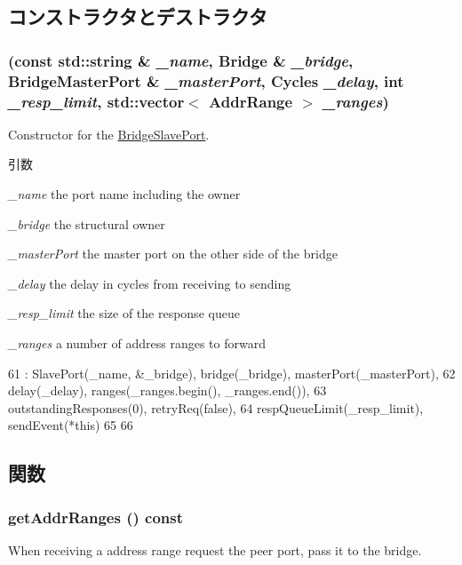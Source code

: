 \subsection{コンストラクタとデストラクタ}
\hypertarget{classBridge_1_1BridgeSlavePort_a2b4ad4cec25b318ebfcf261db753a8fb}{
\subsubsection[{BridgeSlavePort}]{ (const std::string \& {\em \_\-name}, \/  {\bf Bridge} \& {\em \_\-bridge}, \/  {\bf BridgeMasterPort} \& {\em \_\-masterPort}, \/  {\bf Cycles} {\em \_\-delay}, \/  int {\em \_\-resp\_\-limit}, \/  {\bf std::vector}$<$ {\bf AddrRange} $>$ {\em \_\-ranges})}}
\label{classBridge_1_1BridgeSlavePort_a2b4ad4cec25b318ebfcf261db753a8fb}
Constructor for the \hyperlink{classBridge_1_1BridgeSlavePort}{BridgeSlavePort}.


\begin{DoxyParams}{引数}
\item[{\em \_\-name}]the port name including the owner \item[{\em \_\-bridge}]the structural owner \item[{\em \_\-masterPort}]the master port on the other side of the bridge \item[{\em \_\-delay}]the delay in cycles from receiving to sending \item[{\em \_\-resp\_\-limit}]the size of the response queue \item[{\em \_\-ranges}]a number of address ranges to forward \end{DoxyParams}



\begin{DoxyCode}
61     : SlavePort(_name, &_bridge), bridge(_bridge), masterPort(_masterPort),
62       delay(_delay), ranges(_ranges.begin(), _ranges.end()),
63       outstandingResponses(0), retryReq(false),
64       respQueueLimit(_resp_limit), sendEvent(*this)
65 {
66 }
\end{DoxyCode}


\subsection{関数}
\hypertarget{classBridge_1_1BridgeSlavePort_a36cf113d5e5e091ebddb32306c098fae}{
\subsubsection[{getAddrRanges}]{ getAddrRanges () const}}
\label{classBridge_1_1BridgeSlavePort_a36cf113d5e5e091ebddb32306c098fae}
When receiving a address range request the peer port, pass it to the bridge. 

